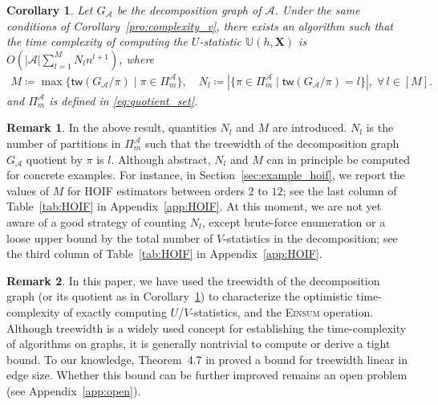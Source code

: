 \documentclass[12pt]{article}
\theoremstyle{plain}
\newtheorem{corollary}{Corollary}
\theoremstyle{definition}
\newtheorem{remark}{Remark}
\def\Einsum{\textsc{Einsum}}
\newcommand{\ustat}{\mathbb{U}}
\newcommand{\ustatp}[2]{\ustat(#1,#2)}
\newcommand{\partition}{\Pi}
\newcommand{\partitionp}[1]{\partition_{#1}}
\newcommand{\treewidthp}[1]{\mathsf{tw}(#1)}
\newcommand{\less}{O}
\def\calA{\mathcal{A}}
\begin{document}
\begin{bibunit}[agsm]
\begin{corollary}
\label{cor:U}
Let $G_\calA$ be the decomposition graph of $\calA$.
Under the same conditions of Corollary~\ref{pro:complexity_v}, there exists an algorithm such that the time complexity of computing the $U$-statistic $\ustatp{h}{\bm{X}}$ is $\less(|\calA| \sum_{l = 1}^{M} N_{l} n^{l + 1})$, where 
\begin{align*}
M \coloneqq \max\{\treewidthp{G_\calA /\pi} \mid \pi \in \partitionp{m}^\calA \}, \quad N_{l} \coloneqq |\{\pi \in \Pi_{m}^{\calA} \mid \treewidthp{G_{\calA} / \pi} = l\}|, \; \forall \, l 
\in [M].
\end{align*}
and $\partitionp{m}^\calA$ is defined in \eqref{eq:quotient_set}.
\end{corollary}

\begin{remark}
\label{rem:U-complexity}
In the above result, quantities $N_{l}$ and $M$ are introduced. $N_{l}$ is the number of partitions in $\Pi_{m}^{\calA}$ such that the treewidth of the decomposition graph $G_{\calA}$ quotient by $\pi$ is $l$. Although abstract, $N_{l}$ and $M$ can in principle be computed for concrete examples. For instance, in Section~\ref{sec:example_hoif}, we report the values of $M$ for HOIF estimators between orders $2$ to $12$; see the last column of Table~\ref{tab:HOIF} in Appendix~\ref{app:HOIF}. At this moment, we are not yet aware of a good strategy of counting $N_{l}$, except brute-force enumeration or a loose upper bound by the total number of $V$-statistics in the decomposition; see the third column of Table~\ref{tab:HOIF} in Appendix~\ref{app:HOIF}.
\end{remark}



\begin{remark}
\label{rem:tw}
In this paper, we have used the treewidth of the decomposition graph (or its quotient as in Corollary~\ref{cor:U}) to characterize the optimistic time-complexity of exactly computing $U$/$V$-statistics, and the \Einsum{} operation. Although treewidth is a widely used concept for establishing the time-complexity of algorithms on graphs, it is generally nontrivial to compute or derive a tight bound. To our knowledge, Theorem~4.7 in \cite{kneis2009bound} proved a bound for treewidth linear in edge size. Whether this bound can be further improved remains an open problem (see Appendix~\ref{app:open}).
\end{remark}


\end{bibunit}
\end{document}
